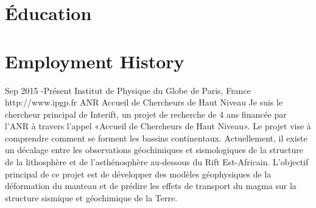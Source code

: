 \documentclass[hidelinks,10pt]{article} %
\begin{document}
\section{Éducation}







\section{Employment History}

\job
{Sep 2015 -}{Présent}
{Institut de Physique du Globe de Paris, France}
{http://www.ipgp.fr}
{ANR Accueil de Chercheurs de Haut Niveau}
{Je suis le chercheur principal de Interift, un projet de recherche de 4 ans financée par l'ANR à travers l'appel «Accueil de Chercheurs de Haut Niveau». Le projet vise à comprendre comment se forment les bassins continentaux. Actuellement, il existe un décalage entre les observations géochimiques et sismologiques de la structure de la lithosphère et de l'asthénosphère au-dessous du Rift Est-Africain. L'objectif principal de ce projet est de développer des modèles géophysiques de la déformation du manteau et de prédire les effets de transport du magma sur la structure sismique et géochimique de la Terre.}
\end{document}
